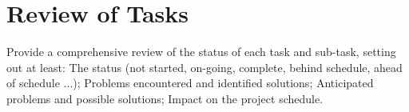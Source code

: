 \section{Review of Tasks}
Provide a comprehensive review of the status of each task and sub-task, setting out at
least:
  The status (not started, on-going, complete, behind schedule, ahead of schedule ...);
  Problems encountered and identified solutions;
  Anticipated problems and possible solutions;
  Impact on the project schedule.